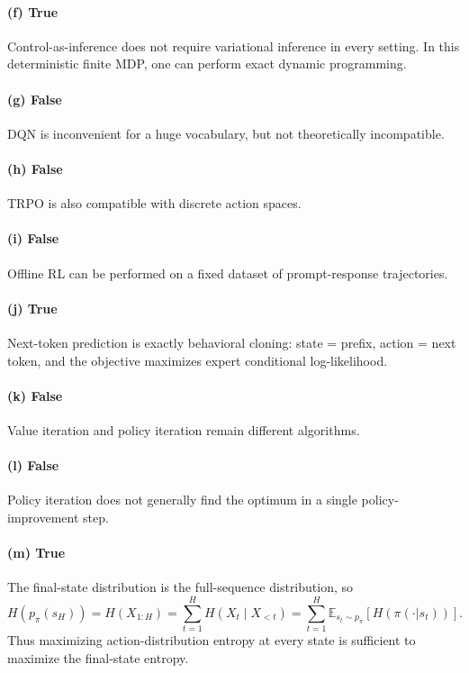 \documentclass[11pt]{article}
\newcommand{\E}{\mathbb{E}}
\newcommand{\1}{\mathbf{1}}
\begin{document}
\paragraph{(f) True}
Control-as-inference does not require variational inference in every setting. In this deterministic finite MDP, one can perform exact dynamic programming.

\paragraph{(g) False}
DQN is inconvenient for a huge vocabulary, but not theoretically incompatible.

\paragraph{(h) False}
TRPO is also compatible with discrete action spaces.

\paragraph{(i) False}
Offline RL can be performed on a fixed dataset of prompt-response trajectories.

\paragraph{(j) True}
Next-token prediction is exactly behavioral cloning: state = prefix, action = next token, and the objective maximizes expert conditional log-likelihood.

\paragraph{(k) False}
Value iteration and policy iteration remain different algorithms.

\paragraph{(l) False}
Policy iteration does not generally find the optimum in a single policy-improvement step.

\paragraph{(m) True}
The final-state distribution is the full-sequence distribution, so
\[
H(p_\pi(s_H))
= H(X_{1:H})
= \sum_{t=1}^H H(X_t\mid X_{<t})
= \sum_{t=1}^H \E_{s_t\sim p_\pi}[H(\pi(\cdot|s_t))].
\]
Thus maximizing action-distribution entropy at every state is sufficient to maximize the final-state entropy.
\end{document}
